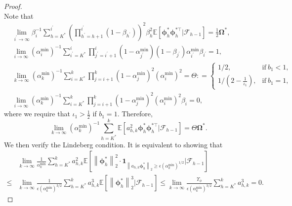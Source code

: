 \documentclass[aos]{imsart}
\numberwithin{equation}{section}
\theoremstyle{plain}
\begin{document}
\begin{appendix}
\begin{proof}
\begin{equation*}
    \end{equation*}
    Note that 
    \begin{equation}
        \begin{split}
            & \lim_{i^{\prime} \to \infty} \beta_{i}^{-1} \sum_{h=K^{*}}^{i^{\prime}} \left( \prod_{h^{\prime}=h+1}^{i^{\prime}} (1-\beta_{h^{\prime}}) \right)^2 \beta_h^2 \mathbb{E}\left[\bm{\phi}^{*}_{h}\bm{\phi}^{*\top}_{h}| \mathcal{F}_{h-1} \right] = \frac{1}{2} \bm{\Omega}^{*},\\
            & \lim_{i \to \infty}  (\alpha^{\min}_{i})^{-1} \sum_{i^{\prime}=K^{*}}^{i} \prod_{j^{\prime}=i^{\prime}+1}^{i} \left(1-\alpha^{\min}_{j^{\prime}} \right) \left(1-\beta_{j^{\prime}} \right) \alpha^{\min}_{i^{\prime}} \beta_{i^{\prime}} =  1,\\
            &  \lim_{k \to \infty}  (\alpha^{\min}_{k})^{-1} \sum_{i=K^{*}}^{k} \prod_{j=i+1}^{k} \left(1-\alpha^{\min}_j \right)^2 (\alpha^{\min}_i)^2 = \Theta : = \left\{ \begin{array}{cc}
               1/2,  & \text{if}~b_1 < 1, \\
               1/\left(2 - \frac{1}{\iota_1}\right),  & \text{if}~b_1 = 1,
            \end{array} \right.\\
            & \lim_{i \to \infty}  (\alpha^{\min}_{k})^{-1}  \sum_{i=K^{*}}^{k} \prod_{j=i+1}^{k} (1-\alpha^{\min}_j)^2 (\alpha^{\min}_i)^2 \beta_{i} = 0,
        \end{split}
    \end{equation}
    where we require that $\iota_1 > \frac{1}{2}$ if $b_1 = 1$.
    Therefore, 
    \begin{equation*}
        \lim_{k \to \infty} (\alpha^{\min}_{k})^{-1}   \sum_{h=K^{*}}^{k} \mathbb{E} \left[ a_{h,k}^2  \bm{\phi}^{*}_{h}\bm{\phi}^{*\top}_{h} | \mathcal{F}_{h-1}\right] = \Theta \bm{\Omega}^{*}.
    \end{equation*}
    We then verify the Lindeberg condition. It is equivalent to showing that 
    \begin{equation}
        \begin{split}
            & \lim_{k \to \infty} \frac{1}{\alpha^{\min}_k } \sum_{h=K^{*}}^{k} a_{h,k}^2 \mathbb{E}\left[ \left\| \bm{\phi}_{h}^{*}\right\|_2^2 \cdot \bm{1}_{\left\|a_{h,k} \bm{\phi}_{h}^{*} \right\|_2 \geq \epsilon  (\alpha^{\min}_k)^{1/2} } | \mathcal{F}_{h-1}\right] \\
            \leq & \lim_{k \to \infty} \frac{1}{\epsilon (\alpha^{\min}_k)^{3/2}} \sum_{h=K^{*}}^{k} a_{h,k}^3 \mathbb{E}\left[ \left\| \bm{\phi}_{h}^{*}\right\|_2^3 | \mathcal{F}_{h-1} \right] \leq \lim_{k \to \infty} \frac{\Upsilon_{\phi}}{\epsilon (\alpha^{\min}_k)^{3/2}} \sum_{h=K^{*}}^{k} a_{h,k}^3 = 0.

\end{split}
\end{equation}
\end{proof}
\end{appendix}
\end{document}
